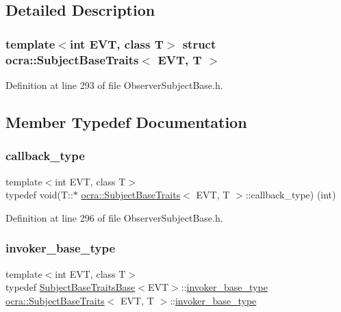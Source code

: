 \subsection{Detailed Description}
\subsubsection*{template$<$int E\+VT, class T$>$\newline
struct ocra\+::\+Subject\+Base\+Traits$<$ E\+V\+T, T $>$}



Definition at line 293 of file Observer\+Subject\+Base.\+h.



\subsection{Member Typedef Documentation}
\hypertarget{structocra_1_1SubjectBaseTraits_ab8c572ba6805d72ddf4137da6e2f4480}{}\label{structocra_1_1SubjectBaseTraits_ab8c572ba6805d72ddf4137da6e2f4480} 
\subsubsection{\texorpdfstring{callback\+\_\+type}{callback\_type}}
{\footnotesize\ttfamily template$<$int E\+VT, class T$>$ \\
typedef void(T\+::$\ast$ \hyperlink{structocra_1_1SubjectBaseTraits}{ocra\+::\+Subject\+Base\+Traits}$<$ E\+VT, T $>$\+::callback\+\_\+type) (int)}



Definition at line 296 of file Observer\+Subject\+Base.\+h.

\hypertarget{structocra_1_1SubjectBaseTraits_a067ad14df588b765cd8941e21348c954}{}\label{structocra_1_1SubjectBaseTraits_a067ad14df588b765cd8941e21348c954} 
\subsubsection{\texorpdfstring{invoker\+\_\+base\+\_\+type}{invoker\_base\_type}}
{\footnotesize\ttfamily template$<$int E\+VT, class T$>$ \\
typedef \hyperlink{structocra_1_1SubjectBaseTraitsBase}{Subject\+Base\+Traits\+Base}$<$E\+VT$>$\+::\hyperlink{structocra_1_1SubjectBaseTraitsBase_a439671662c8f8f3e80e6675f008dec3f}{invoker\+\_\+base\+\_\+type} \hyperlink{structocra_1_1SubjectBaseTraits}{ocra\+::\+Subject\+Base\+Traits}$<$ E\+VT, T $>$\+::\hyperlink{structocra_1_1SubjectBaseTraitsBase_a439671662c8f8f3e80e6675f008dec3f}{invoker\+\_\+base\+\_\+type}}



